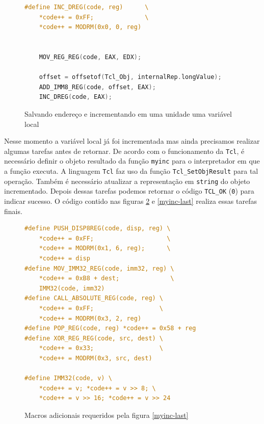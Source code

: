 \begin{figure}[h]
  \centering
  \begin{lstlisting}[language=C]
#define INC_DREG(code, reg)      \
    *code++ = 0xFF;              \
    *code++ = MODRM(0x0, 0, reg)


    MOV_REG_REG(code, EAX, EDX);

    offset = offsetof(Tcl_Obj, internalRep.longValue);
    ADD_IMM8_REG(code, offset, EAX);
    INC_DREG(code, EAX);
  \end{lstlisting}
  \caption{Salvando endereço e incrementando em uma unidade uma variável local\label{inc-tclobj}}
\end{figure}

Nesse momento a variável local já foi incrementada mas ainda
precisamos realizar algumas tarefas antes de retornar. De acordo com o
funcionamento da \texttt{Tcl}, é
necessário definir o objeto resultado da função \verb!myinc! para o
interpretador em que a função executa. A linguagem
\texttt{Tcl} faz uso da função \verb!Tcl_SetObjResult! para tal
operação. Também é necessário atualizar a representação em
\verb!string! do objeto incrementado. Depois dessas tarefas podemos
retornar o código \verb!TCL_OK! (\verb!0!) para indicar sucesso.
O código contido nas figuras \ref{myinc-last-macros} e \ref{myinc-last}
realiza essas tarefas finais.

\begin{figure}[ht!]
  \centering
  \begin{lstlisting}[language=C]
#define PUSH_DISP8REG(code, disp, reg) \
    *code++ = 0xFF;                    \
    *code++ = MODRM(0x1, 6, reg);      \
    *code++ = disp
#define MOV_IMM32_REG(code, imm32, reg) \
    *code++ = 0xB8 + dest;              \
    IMM32(code, imm32)
#define CALL_ABSOLUTE_REG(code, reg) \
    *code++ = 0xFF;                  \
    *code++ = MODRM(0x3, 2, reg)
#define POP_REG(code, reg) *code++ = 0x58 + reg
#define XOR_REG_REG(code, src, dest) \
    *code++ = 0x33;                  \
    *code++ = MODRM(0x3, src, dest)

#define IMM32(code, v) \
    *code++ = v; *code++ = v >> 8; \
    *code++ = v >> 16; *code++ = v >> 24
  \end{lstlisting}
  \caption{Macros adicionais requeridos pela figura \ref{myinc-last}\label{myinc-last-macros}}
\end{figure}


